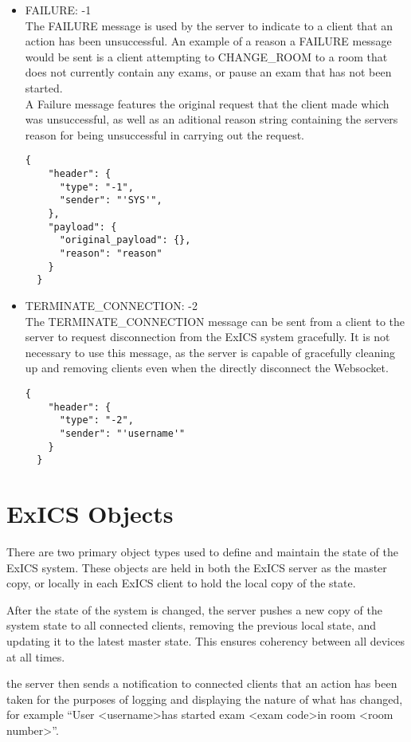 \begin{itemize}
\item FAILURE: -1\\
  The FAILURE message is used by the server to indicate to a client that an action has been unsuccessful.  An example of a reason a FAILURE message would be sent is a client attempting to CHANGE\_ROOM to a room that does not currently contain any exams, or pause an exam that has not been started.\\
  A Failure message features the original request that the client made which was unsuccessful, as well as an aditional reason string containing the servers reason for being unsuccessful in carrying out the request.
  \lstset{language=JSON}
  \begin{lstlisting}[tabsize=2,breaklines=true]
  {
    "header": {
      "type": "-1",
      "sender": "'SYS'",
    },
    "payload": {
      "original_payload": {},
      "reason": "reason"
    }
  }
  \end{lstlisting}
\item TERMINATE\_CONNECTION: -2\\
  The TERMINATE\_CONNECTION message can be sent from a client to the server to request disconnection from the ExICS system gracefully.  It is not necessary to use this message, as the server is capable of gracefully cleaning up and removing clients even when the directly disconnect the Websocket.
  \lstset{language=JSON}
  \begin{lstlisting}[tabsize=2,breaklines=true]
  {
    "header": {
      "type": "-2",
      "sender": "'username'"
    }
  }
  \end{lstlisting}

\end{itemize}

\section{ExICS Objects}
\label{sec:exics_objs}

There are two primary object types used to define and maintain the state of the ExICS system.  These objects are held in both the ExICS server as the master copy, or locally in each ExICS client to hold the local copy of the state.

After the state of the system is changed, the server pushes a new copy of the system state to all connected clients, removing the previous local state, and updating it to the latest master state.  This ensures coherency between all devices at all times.

the server then sends a notification to connected clients that an action has been taken for the purposes of logging and displaying the nature of what has changed, for example ``User \textless username\textgreater has started exam \textless exam code\textgreater in room \textless room number\textgreater''.

